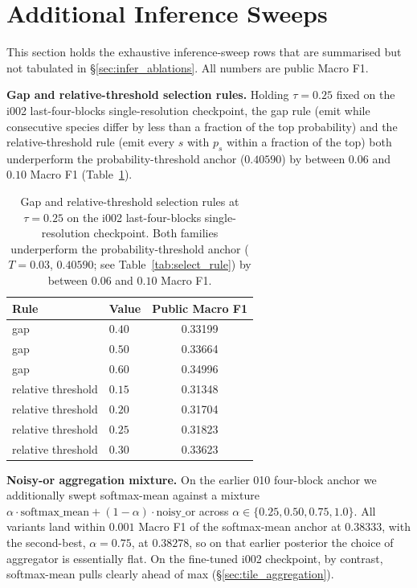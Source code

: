 \section{Additional Inference Sweeps}
\label{sec:appendix_extra_sweeps}

This section holds the exhaustive inference-sweep rows that are summarised but not tabulated in
\S\ref{sec:infer_ablations}. All numbers are public Macro F1.

\textbf{Gap and relative-threshold selection rules.} Holding $\tau{=}0.25$ fixed on the i002
last-four-blocks single-resolution checkpoint, the gap rule (emit while consecutive species differ
by less than a fraction of the top probability) and the relative-threshold rule (emit every $s$
with $p_s$ within a fraction of the top) both underperform the probability-threshold anchor
($0.40590$) by between $0.06$ and $0.10$ Macro F1 (Table~\ref{tab:select_rule_extra}).

\begin{table}[ht]
  \centering
  \small
  \begin{tabular}{llc}
    \toprule
    Rule & Value & Public Macro F1 \\
    \midrule
    gap                                  & $0.40$    & 0.33199 \\
    gap                                  & $0.50$    & 0.33664 \\
    gap                                  & $0.60$    & 0.34996 \\
    \midrule
    relative threshold                   & $0.15$    & 0.31348 \\
    relative threshold                   & $0.20$    & 0.31704 \\
    relative threshold                   & $0.25$    & 0.31823 \\
    relative threshold                   & $0.30$    & 0.33623 \\
    \bottomrule
  \end{tabular}
  \caption{Gap and relative-threshold selection rules at $\tau{=}0.25$ on the i002 last-four-blocks single-resolution checkpoint. Both families underperform the probability-threshold anchor ($T{=}0.03$, $0.40590$; see Table~\ref{tab:select_rule}) by between $0.06$ and $0.10$ Macro F1.}
  \label{tab:select_rule_extra}
\end{table}

\textbf{Noisy-or aggregation mixture.} On the earlier 010 four-block anchor we additionally swept
softmax-mean against a mixture $\alpha \cdot \text{softmax\_mean} + (1{-}\alpha) \cdot
\text{noisy\_or}$ across $\alpha \in \{0.25, 0.50, 0.75, 1.0\}$. All variants land within $0.001$
Macro F1 of the softmax-mean anchor at $0.38333$, with the second-best, $\alpha{=}0.75$, at
$0.38278$, so on that earlier posterior the choice of aggregator is essentially flat. On the
fine-tuned i002 checkpoint, by contrast, softmax-mean pulls clearly ahead of max
(\S\ref{sec:tile_aggregation}).
